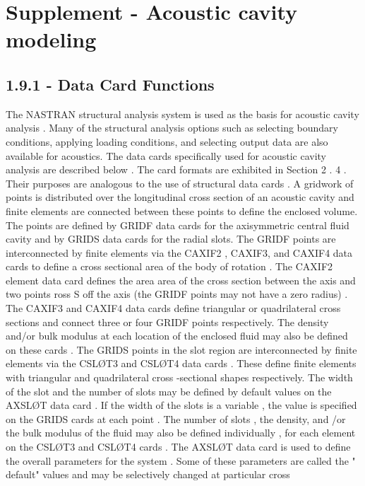 \documentclass{article}
\begin{document}
\section{Supplement - Acoustic cavity modeling}

\subsection{1.9.1 - Data Card Functions}

The NASTRAN structural analysis system is used as the basis for acoustic cavity analysis .
Many of the structural analysis options such as selecting boundary conditions, applying loading
conditions, and selecting output data are also available for acoustics.
The data cards specifically used for acoustic cavity analysis are described below . The card
formats are exhibited in Section 2 . 4 . Their purposes are analogous to the use of structural data
cards . A gridwork of points is distributed over the longitudinal cross section of an acoustic
cavity and finite elements are connected between these points to define the enclosed volume.
The points are defined by GRIDF data cards for the axisymmetric central fluid cavity and by
GRIDS data cards for the radial slots. The GRIDF points are interconnected by finite elements via
the CAXIF2 , CAXIF3, and CAXIF4 data cards to define a cross sectional area of the body of rotation .
The CAXIF2 element data card defines the area
area of the cross section between the axis and two points
ross
S
off the axis (the GRIDF points may not have a zero radius) . The CAXIF3 and CAXIF4 data cards define
triangular or quadrilateral cross sections and connect three or four GRIDF points respectively.
The density and/or bulk modulus at each location of the enclosed fluid may also be defined on these
cards .
The GRIDS points in the slot region are interconnected by finite elements via the CSLØT3 and
CSLØT4 data cards .
These define finite elements with triangular and quadrilateral cross -sectional
shapes respectively. The width of the slot and the number of slots may be defined by default
values on the AXSLØT data card .
If the width of the slots is a variable , the value is specified
on the GRIDS cards at each point . The number of slots , the density, and /or the bulk modulus of
the fluid may also be defined individually , for each element on the CSLØT3 and CSLØT4 cards .
The AXSLØT data card is used to define the overall parameters for the system . Some of these
parameters are called the " default" values and may be selectively changed at particular cross
\end{document}

